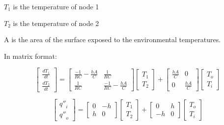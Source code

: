 \({T_1}\) is the temperature of node 1

\({T_2}\) is the temperature of node 2

A is the area of the surface exposed to the environmental temperatures.

In matrix format:

\begin{equation}
\left[ {\begin{array}{ccc}{\frac{{d{T_1}}}{{dt}}}\\ {\frac{{d{T_2}}}{{dt}}}\end{array}} \right] = \left[ {\begin{array}{ccc}{\frac{{ - 1}}{{RC}} - \frac{{hA}}{C}}&{\frac{1}{{RC}}}\\ {\frac{1}{{RC}}}&{\frac{{ - 1}}{{RC}} - \frac{{hA}}{C}}\end{array}} \right]\left[ {\begin{array}{ccc}{{T_1}}\\ {{T_2}}\end{array}} \right] + \left[ {\begin{array}{ccc}{\frac{{hA}}{C}}&0\\0&{\frac{{hA}}{C}}\end{array}} \right]\left[ {\begin{array}{ccc}{{T_o}}\\ {{T_i}}\end{array}} \right]
\label{eq:QTFDeriv640}
\end{equation}

\begin{equation}
\left[ {\begin{array}{ccc}{{{q''}_i}}\\ {{{q''}_o}}\end{array}} \right] = \left[ {\begin{array}{ccc}0&{ - h}\\h&0\end{array}} \right]\left[ {\begin{array}{ccc}{{T_1}}\\ {{T_2}}\end{array}} \right] + \left[ {\begin{array}{ccc}0&h\\ { - h}&0\end{array}} \right]\left[ {\begin{array}{ccc}{{T_o}}\\ {{T_i}}\end{array}} \right]
\end{equation}

